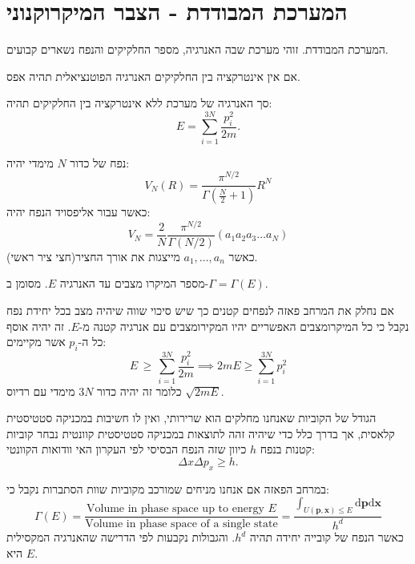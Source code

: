 \documentclass{tstextbook}
\begin{document}
\section{המערכת המבודדת - הצבר המיקרוקנוני}

\begin{definition}
המערכת המבודדת. זוהי מערכת שבה האנרגיה, מספר החלקיקים והנפח נשארים קבועים.

\end{definition}
\begin{proposition}
אם אין אינטרקציה בין החלקיקים האנרגיה הפוטנציאלית תהיה אפס.

\end{proposition}
\begin{corollary}
סך האנרגיה של מערכת ללא אינטרקציה בין החלקיקים תהיה:
$$E=\sum_{i=1}^{3N}\frac{p_{i}^{2}}{2m}.$$

\end{corollary}
\begin{reminder}
נפח של כדור \(N\) מימדי יהיה:
$$V_{N}(R)=\frac{\pi^{N/2}}{\Gamma\left(\frac{N}{2}+1\right)}R^{N}$$
כאשר עבור אליפסויד הנפח יהיה:
$$V_{N}=\frac{2}{N}\frac{\pi^{N/2}}{\Gamma(N/2)}(a_{1}a_{2}a_{3}\ldots a_{N})$$
כאשר \(a_{1},\dots,a_{n}\) מייצגות את אורך החציר(חצי ציר ראשי).

\end{reminder}
\begin{definition}
מספר המיקרו מצבים עד האנרגיה \(E\). מסומן ב-\(\Gamma=\Gamma(E)\).

\end{definition}
\begin{proposition}
אם נחלק את המרחב פאזה לנפחים קטנים כך שיש סיכוי שווה שיהיה מצב בכל יחידת נפח נקבל כי כל המיקרומצבים האפשריים יהיו המקירומצבים עם אנרגיה קטנה מ-\(E\). זה יהיה אוסף כל ה-\(p_{i}\) אשר מקיימים:
$$E\,\geq\,\sum_{i=1}^{3N}\frac{p_{i}^{2}}{2m}\implies 2mE \geq \sum_{i=1}^{3N} p_{i}^{2}$$
כלומר זה יהיה כדור \(3N\) מימדי עם רדיוס \(\sqrt{ 2mE }\).

\end{proposition}
\begin{remark}
הגודל של הקוביות שאנחנו מחלקים הוא שרירותי, ואין לו חשיבות במכניקה סטטיסטית קלאסית, אך בדרך כלל כדי שיהיה זהה לתוצאות במכניקה סטטיסטית קוונטית נבחר קוביות קטנות בנפח \(h\) כיוון שזה הנפח הבסיסי לפי העקרון האי וודואות הקוונטי:
$$\Delta x\Delta p_{x}\geq h.$$

\end{remark}
\begin{proposition}
במרחב הפאזה אם אנחנו מניחים שמורכב מקוביות שוות הסתברות נקבל כי:
$$\Gamma\left(E\right)={\frac{\text{Volume in phase space up to energy }E}{\text{Volume in phase space of a single state}}}=\frac{\int_{U\left( \mathbf{p},\mathbf{x} \right)\leq E}\mathrm{d}\mathbf{p}\mathrm{d}\mathbf{x}}{h^{d}} $$
כאשר הנפח של קובייה יחידה תהיה \(h^{d}\). והגבולות נקבעות לפי הדרישה שהאנרגיה המקסילית היא \(E\).

\end{proposition}
\end{document}
